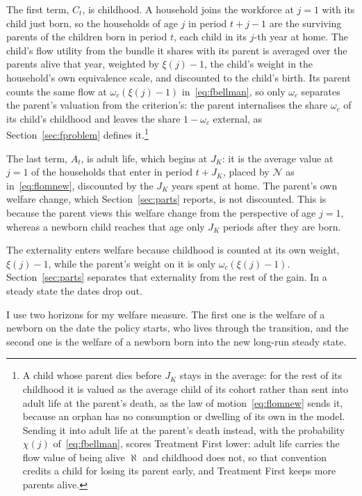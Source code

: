 \documentclass[10pt]{article}
\begin{document}
The first term, $C_t$, is childhood. A household joins the workforce at $j=1$ with its child just born, so the households of age $j$ in period $t+j-1$ are the surviving parents of the children born in period $t$, each child in its $j$-th year at home. The child's flow utility from the bundle it shares with its parent is averaged over the parents alive that year, weighted by $\xi(j)-1$, the child's weight in the household's own equivalence scale, and discounted to the child's birth. Its parent counts the same flow at $\omega_c(\xi(j)-1)$ in~\eqref{eq:fbellman}, so only $\omega_c$ separates the parent's valuation from the criterion's: the parent internalises the share $\omega_c$ of its child's childhood and leaves the share $1-\omega_c$ external, as Section~\ref{sec:fproblem} defines it.\footnote{A child whose parent dies before $J_K$ stays in the average: for the rest of its childhood it is valued as the average child of its cohort rather than sent into adult life at the parent's death, as the law of motion~\eqref{eq:flomnew} sends it, because an orphan has no consumption or dwelling of its own in the model. Sending it into adult life at the parent's death instead, with the probability $\chi(j)$ of~\eqref{eq:fbellman}, scores Treatment First lower: adult life carries the flow value of being alive $\aleph$ and childhood does not, so that convention credits a child for losing its parent early, and Treatment First keeps more parents alive.}

The last term, $A_t$, is adult life, which begins at $J_K$: it is the average value at $j=1$ of the households that enter in period $t+J_K$, placed by $\mathcal N$ as in~\eqref{eq:flomnew}, discounted by the $J_K$ years spent at home.    The parent's own welfare change, which Section~\ref{sec:parts} reports, is not discounted. This is because the parent views this welfare change from the perspective of age $j=1$, whereas a newborn child reaches that age only $J_K$ periods after they are born. 

 The externality enters welfare because childhood is counted at its own weight, $\xi(j)-1$, while the parent's weight on it is only $\omega_c(\xi(j)-1)$. Section~\ref{sec:parts} separates that externality from the rest of the gain. In a steady state the dates drop out.

  I use two horizons for my welfare measure. The first one is the welfare of a newborn on the date the policy starts, who lives through the transition, and the second one is the welfare of a newborn born into the new long-run steady state.
\end{document}
